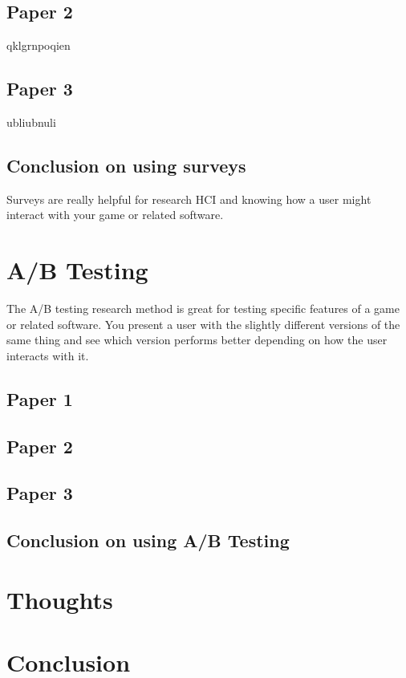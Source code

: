 \documentclass{scrartcl}
\begin{document}
\subsection{Paper 2 \cite{two}}
qklgrnpoqien

\subsection{Paper 3 \cite{three}}
ubliubnuli

\subsection{Conclusion on using surveys}
Surveys are really helpful for research HCI and knowing how a user might interact with your game or related software.

\section{A/B Testing}
The A/B testing research method is great for testing specific features of a game or related software. You present a user with the slightly different versions of the same thing and see which version performs better depending on how the user interacts with it.

\subsection{Paper 1}

\subsection{Paper 2}

\subsection{Paper 3}

\subsection{Conclusion on using A/B Testing}

\section{Thoughts}

\section{Conclusion}




\end{document}
